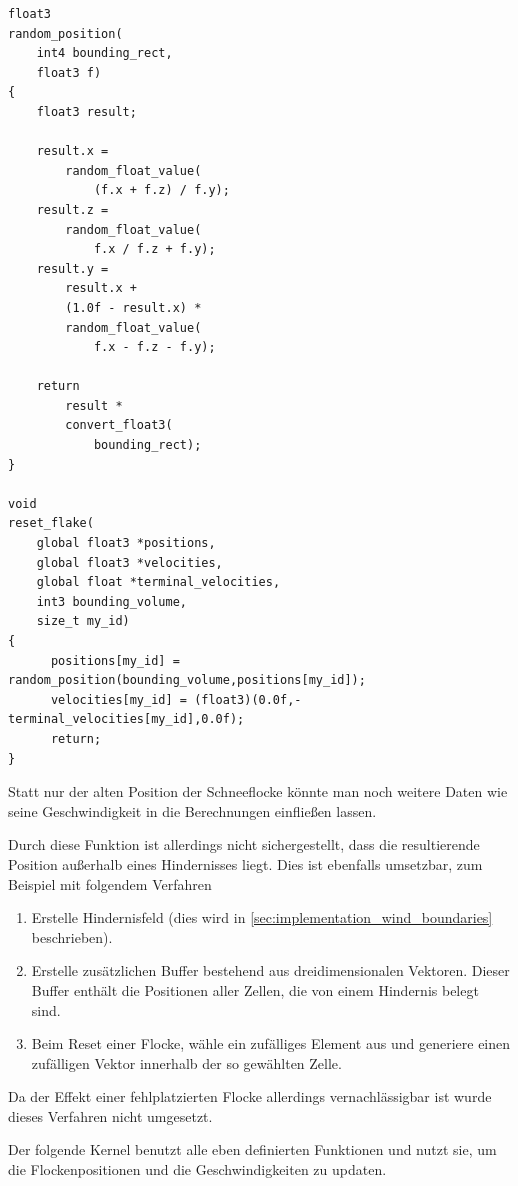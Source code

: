 \begin{verbatim}
float3
random_position(
    int4 bounding_rect,
    float3 f)
{
    float3 result;

    result.x =
        random_float_value(
            (f.x + f.z) / f.y);
    result.z =
        random_float_value(
            f.x / f.z + f.y);
    result.y =
        result.x +
        (1.0f - result.x) *
        random_float_value(
            f.x - f.z - f.y);

    return
        result *
        convert_float3(
            bounding_rect);
}

void
reset_flake(
    global float3 *positions,
    global float3 *velocities,
    global float *terminal_velocities,
    int3 bounding_volume,
    size_t my_id)
{
      positions[my_id] = random_position(bounding_volume,positions[my_id]);
      velocities[my_id] = (float3)(0.0f,-terminal_velocities[my_id],0.0f);
      return;
}
\end{verbatim}

Statt nur der alten Position der Schneeflocke könnte man noch weitere
Daten wie seine Geschwindigkeit in die Berechnungen einfließen lassen.

Durch diese Funktion ist allerdings nicht sichergestellt, dass die
resultierende Position außerhalb eines Hindernisses liegt. Dies ist
ebenfalls umsetzbar, zum Beispiel mit folgendem Verfahren

\begin{enumerate}
\item Erstelle Hindernisfeld (dies wird in
\ref{sec:implementation_wind_boundaries} beschrieben).
\item Erstelle zusätzlichen Buffer
 bestehend aus dreidimensionalen
Vektoren. Dieser Buffer enthält die Positionen aller Zellen, die von
einem Hindernis belegt sind.
\item Beim Reset einer Flocke, wähle ein zufälliges Element aus
 und generiere einen zufälligen
Vektor innerhalb der so gewählten Zelle.
\end{enumerate}

Da der Effekt einer fehlplatzierten Flocke allerdings vernachlässigbar
ist wurde dieses Verfahren nicht umgesetzt.

Der folgende Kernel benutzt alle eben definierten Funktionen und nutzt
sie, um die Flockenpositionen und die Geschwindigkeiten
zu updaten.

